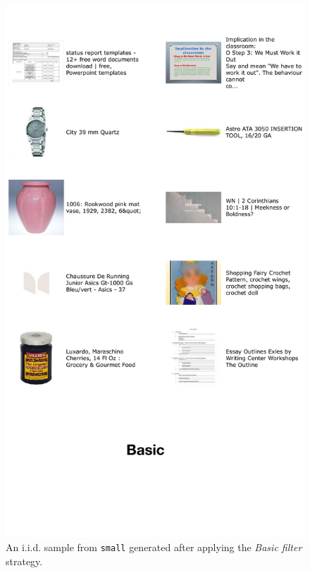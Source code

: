 \begin{figure}
    \centering
    \includegraphics[width=0.9\linewidth]{figures/appx-basic.pdf}
    \caption{An i.i.d. sample from {\small \texttt{small}} \pool generated after applying the \emph{Basic filter} strategy.}
    \label{fig:basic_filter}
\end{figure}

